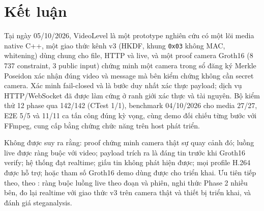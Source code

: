 \documentclass[10pt,a4paper]{article}
\begin{document}
\section{Kết luận}

Tại ngày 05/10/2026, VideoLevel là một prototype nghiên cứu có một lõi media native C++, một giao thức kênh v3 (HKDF, khung \texttt{0x03} không MAC, whitening) dùng chung cho file, HTTP và live, và một proof camera Groth16 (8\,737 constraint, 3 public input) chứng minh một camera trong sổ đăng ký Merkle Poseidon xác nhận đúng video và message mà bên kiểm chứng không cần secret camera. Xác minh fail-closed và là bước duy nhất xác thực payload; dịch vụ HTTP/WebSocket đã được làm cứng ở ranh giới xác thực và tài nguyên. Bộ kiểm thử 12 phase qua 142/142 (CTest 1/1), benchmark 04/10/2026 cho media 27/27, E2E 5/5 và 11/11 ca tấn công đúng kỳ vọng, cùng demo đối chiếu từng bước với FFmpeg, cung cấp bằng chứng chức năng trên host phát triển.

Không được suy ra rằng: proof chứng minh camera thật sự quay cảnh đó; luồng live được ràng buộc với video; payload trích ra là đáng tin trước khi Groth16 verify; hệ thống đạt realtime; giấu tin không phát hiện được; mọi profile H.264 được hỗ trợ; hoặc tham số Groth16 demo dùng được cho triển khai. Ưu tiên tiếp theo, theo : ràng buộc luồng live theo đoạn và phiên, nghi thức Phase 2 nhiều bên, đo lại realtime với giao thức v3 trên camera thật và thiết bị triển khai, và đánh giá steganalysis.
\end{document}
